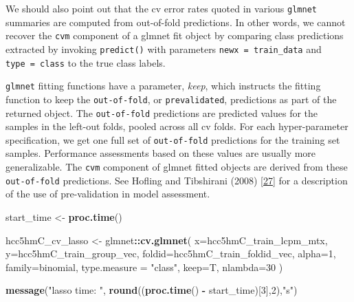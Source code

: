 \documentclass[
]{book}
\newenvironment{Shaded}{\begin{snugshade}}{\end{snugshade}}
\newcommand{\DataTypeTok}[1]{\textcolor[rgb]{0.13,0.29,0.53}{#1}}
\newcommand{\DecValTok}[1]{\textcolor[rgb]{0.00,0.00,0.81}{#1}}
\newcommand{\KeywordTok}[1]{\textcolor[rgb]{0.13,0.29,0.53}{\textbf{#1}}}
\newcommand{\NormalTok}[1]{#1}
\newcommand{\OperatorTok}[1]{\textcolor[rgb]{0.81,0.36,0.00}{\textbf{#1}}}
\newcommand{\StringTok}[1]{\textcolor[rgb]{0.31,0.60,0.02}{#1}}
\begin{document}
We should also point out that the cv error rates quoted in various \texttt{glmnet} summaries
are computed from out-of-fold predictions. In other words,
we cannot recover the \texttt{cvm} component of a glmnet fit object by comparing
class predictions extracted by invoking \texttt{predict()} with parameters \texttt{newx\ =\ train\_data}
and \texttt{type\ =\ \textquotesingle{}class\textquotesingle{}} to the true class labels.

\texttt{glmnet} fitting functions have a
parameter, \emph{keep}, which instructs the fitting function to keep the
\texttt{out-of-fold}, or \texttt{prevalidated}, predictions as part of the returned object. The
\texttt{out-of-fold} predictions are predicted values for the samples in the
left-out folds, pooled across all cv folds. For each hyper-parameter
specification, we get one full set of \texttt{out-of-fold} predictions for
the training set samples. Performance assessments based on these
values are usually more generalizable. The \texttt{cvm} component of glmnet fitted
objects are derived from these \texttt{out-of-fold} predictions.
See Hofling and Tibshirani (2008) {[}\protect\hyperlink{ref-Hofling:2008aa}{27}{]}
for a description of the use of pre-validation in model assessment.

\begin{Shaded}
\begin{Highlighting}[]
\NormalTok{start\_time <{-}}\StringTok{  }\KeywordTok{proc.time}\NormalTok{()}

\NormalTok{hcc5hmC\_cv\_lasso <{-}}\StringTok{ }\NormalTok{glmnet}\OperatorTok{::}\KeywordTok{cv.glmnet}\NormalTok{(}
 \DataTypeTok{x=}\NormalTok{hcc5hmC\_train\_lcpm\_mtx,}
 \DataTypeTok{y=}\NormalTok{hcc5hmC\_train\_group\_vec,}
 \DataTypeTok{foldid=}\NormalTok{hcc5hmC\_train\_foldid\_vec,}
 \DataTypeTok{alpha=}\DecValTok{1}\NormalTok{,}
 \DataTypeTok{family=}\StringTok{\textquotesingle{}binomial\textquotesingle{}}\NormalTok{, }
 \DataTypeTok{type.measure =} \StringTok{"class"}\NormalTok{,}
 \DataTypeTok{keep=}\NormalTok{T,}
 \DataTypeTok{nlambda=}\DecValTok{30}
\NormalTok{)}

\KeywordTok{message}\NormalTok{(}\StringTok{"lasso time: "}\NormalTok{, }\KeywordTok{round}\NormalTok{((}\KeywordTok{proc.time}\NormalTok{() }\OperatorTok{{-}}\StringTok{ }\NormalTok{start\_time)[}\DecValTok{3}\NormalTok{],}\DecValTok{2}\NormalTok{),}\StringTok{"s"}\NormalTok{)}
\end{Highlighting}
\end{Shaded}
\end{document}
